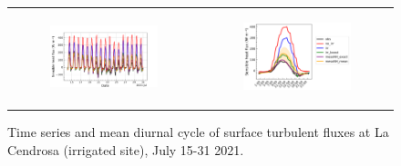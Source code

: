 \begin{figure}[hbtp]
\begin{tabular}{cc}
        \vspace{1em} %

        \begin{subfigure}[t]{0.5\textwidth}
            \caption{}
            \includegraphics[width=\textwidth]{images/chap5/time_series_cendrosa_sens.png}
        \end{subfigure} &
        \begin{subfigure}[t]{0.5\textwidth}
            \caption{}
            \includegraphics[width=\textwidth]{images/chap5/diurnal_cycle_cendrosa_sens.png}
        \end{subfigure} \\
    \end{tabular}
    \caption{Time series and mean diurnal cycle of surface turbulent fluxes at La Cendrosa (irrigated site), July 15-31 2021.}
\end{figure}

